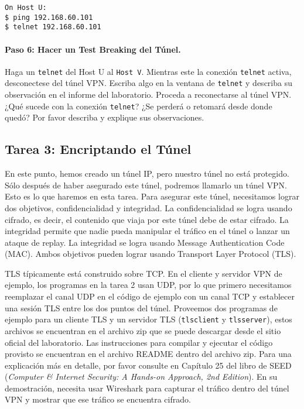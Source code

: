 \begin{lstlisting}
On Host U:
$ ping 192.168.60.101
$ telnet 192.168.60.101
\end{lstlisting}


\paragraph{Paso 6: Hacer un Test Breaking del Túnel.} 
Haga un \texttt{telnet} del Host U al \texttt{Host V}. Mientras este la conexión \texttt{telnet} activa, desconectese del túnel VPN. Escriba algo en la ventana de \texttt{telnet} y describa su observación en el informe del laboratorio.
Proceda a reconectarse al túnel VPN. ¿Qué sucede con la conexión \texttt{telnet}? ¿Se perderá o retomará desde donde quedó?
Por favor describa y explique sus observaciones.


\subsection{Tarea 3: Encriptando el Túnel}


En este punto, hemos creado un túnel IP, pero nuestro túnel no está protegido.
Sólo después de haber asegurado este túnel, podremos llamarlo un túnel VPN.
Esto es lo que haremos en esta tarea.
Para asegurar este túnel, necesitamos lograr dos objetivos, confidencialidad y integridad.
La confidencialidad se logra usando cifrado, es decir, el contenido que viaja por este túnel debe de estar cifrado.
La integridad permite que nadie pueda manipular el tráfico en el túnel o lanzar un ataque de replay.
La integridad se logra usando Message Authentication Code (MAC).
Ambos objetivos pueden lograr usando Transport Layer Protocol (TLS). 

TLS típicamente está construido sobre TCP. En el cliente y servidor VPN de ejemplo, los programas en la tarea 2 usan UDP, por lo que primero necesitamos reemplazar el canal UDP en el código de ejemplo con un canal TCP y establecer una sesión TLS entre los dos puntos del túnel. Proveemos dos programas de ejemplo para un cliente TLS y un servidor TLS (\texttt{tlsclient} y \texttt{tlsserver}), estos archivos se encuentran en el archivo zip que se puede descargar desde el sitio oficial del laboratorio.
Las instrucciones para compilar y ejecutar el código provisto se encuentran en el archivo README dentro del archivo zip.
Para una explicación más en detalle, por favor consulte en Capítulo 25 del libro de SEED (\textit{Computer \& Internet Security: A Hands-on Approach, 2nd Edition}). En su demostración, necesita usar Wireshark para capturar el tráfico dentro del túnel VPN y mostrar que ese tráfico se encuentra cifrado.

